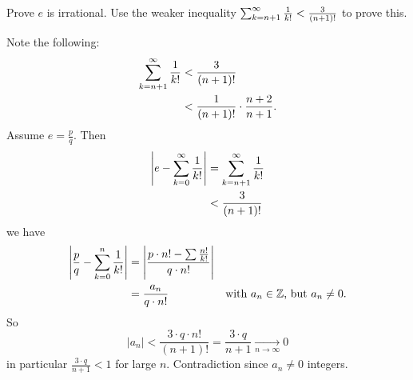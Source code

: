 \documentclass[10pt, a4paper]{article}
\begin{document}
\begin{problem}[7]
    Prove $e$ is irrational.
    Use the weaker inequality $\infsum[k = n + 1]\frac{1}{k!} < \frac{3}{(n + 1)!}$ to prove this.
    
    \begin{solution}
        Note the following:
        \begin{align*}
            \infsum[k = n + 1]\frac{1}{k!} &< \frac{3}{(n + 1)!} \\
            &< \frac{1}{(n + 1)!}\cdot\frac{n + 2}{n + 1}.
        \end{align*}
        Assume $e = \frac{p}{q}$.
        Then
        \begin{align*}
            \left|e - \infsumo\frac{1}{k!}\right| &= \infsum[k = n + 1]\frac{1}{k!} \\
            &< \frac{3}{(n + 1)!}
        \end{align*}
        we have
        \begin{align*}
            \left|\frac{p}{q} - \sum_{k = 0}^{n}\frac{1}{k!}\right| &= \left|\frac{p\cdot n! - \sum\frac{n!}{k!}}{q\cdot n!}\right| \\
            &= \frac{a_n}{q\cdot n!}&\text{with $a_n \in \Z$, but $a_n \neq 0$}.
        \end{align*}
        So
        \[
        |a_n| < \frac{3 \cdot q \cdot n!}{(n + 1)!} = \frac{3\cdot q}{n + 1} \xrightarrow[n \rightarrow \infty]{} 0
        \]
        in particular $\frac{3\cdot q}{n + 1} < 1$ for large $n$.
        Contradiction since $a_n \neq 0$ integers.
    \end{solution}
\end{problem}
\end{document}
